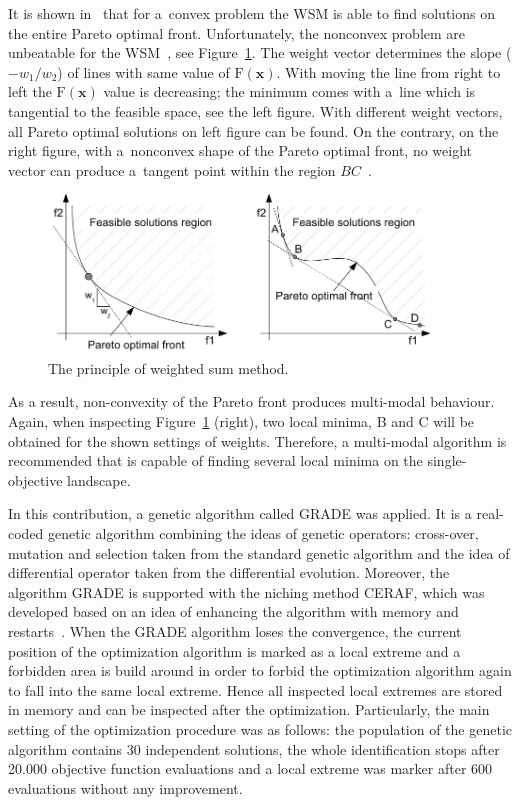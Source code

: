 \documentclass [12pt]{article}
\newcommand\vek[1]{\mathbf{#1}}                       %
\newcommand\funct[2]{\ensuremath{{\mathrm#1}({#2})}}  %
\begin{document}
It is shown in~\cite{Miettinen:1999:MO} that for a~convex problem the WSM is able to find solutions on the entire Pareto optimal front. Unfortunately, the nonconvex problem are unbeatable for the WSM~\cite{deb:2001}, see Figure~\ref{fig:WSM}. The weight vector determines the slope ($-w_1/w_2$) of lines with same value of $\funct{F}{\vek{x}}$. With moving the line from right to left the $\funct{F}{\vek{x}}$ value is decreasing; the minimum comes with a~line which is tangential to the feasible space, see the left figure. With different weight vectors, all Pareto optimal solutions on left figure can be found. On the contrary, on the right figure, with a~nonconvex shape of the Pareto optimal front, no weight vector can produce a~tangent point within the region $BC$~\cite{deb:2001}.
%
\begin{figure}[!tb]
\centering
         \includegraphics*[width=0.90\textwidth]{Figures/wsm.jpg}

    \caption{The principle of weighted sum method.}
\label{fig:WSM}
\end{figure}
%

As a result, non-convexity of the Pareto front produces multi-modal behaviour. Again, when inspecting Figure~\ref{fig:WSM} (right), two local minima, B and C will be obtained for the shown settings of weights. Therefore, a multi-modal algorithm is recommended that is capable of finding several local minima on the single-objective landscape.

In this contribution, a genetic algorithm called GRADE \cite{Ibrahimbegovic:2004,Kucerova:2007:PHD} was applied. It is a real-coded genetic algorithm combining the ideas of genetic operators: cross-over, mutation and selection taken from the
standard genetic algorithm and the idea of differential operator taken from the differential evolution.
Moreover, the algorithm GRADE is supported with the niching method
CERAF, which was developed based on an idea of enhancing the algorithm with
memory and restarts~\cite{Hrstka:2004:AES}. When the GRADE algorithm loses the convergence, the current position of the optimization algorithm is marked as a local extreme and a forbidden area is build around in order to forbid the optimization algorithm again to fall into the same local extreme. Hence all inspected local extremes are stored in memory and can be inspected after the optimization.
Particularly, the main setting of the optimization procedure was as follows: the population of the genetic algorithm contains 30 independent solutions, the whole identification stops after 20.000 objective function evaluations and a local extreme was marker after 600 evaluations without any improvement.
\end{document}
